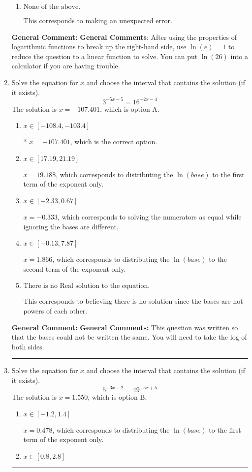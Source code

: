 \documentclass{extbook}[14pt]
\newcommand{\litem}[1]{\item #1

\rule{\textwidth}{0.4pt}}
\begin{document}
\begin{enumerate}
{\begin{enumerate}[label=\Alph*.]
This corresponds to believing you cannot solve the equation.
\item \( \text{None of the above.} \)

This corresponds to making an unexpected error.
\end{enumerate}

\textbf{General Comment:} \textbf{General Comments}: After using the properties of logarithmic functions to break up the right-hand side, use $\ln(e) = 1$ to reduce the question to a linear function to solve. You can put $\ln(26)$ into a calculator if you are having trouble.
}
\litem{
Solve the equation for $x$ and choose the interval that contains the solution (if it exists).
\[ 3^{-5x-5} = 16^{-2x-4} \]The solution is \( x = -107.401 \), which is option A.\begin{enumerate}[label=\Alph*.]
\item \( x \in [-108.4, -103.4] \)

* $x = -107.401$, which is the correct option.
\item \( x \in [17.19, 21.19] \)

$x = 19.188$, which corresponds to distributing the $\ln(base)$ to the first term of the exponent only.
\item \( x \in [-2.33, 0.67] \)

$x = -0.333$, which corresponds to solving the numerators as equal while ignoring the bases are different.
\item \( x \in [-0.13, 7.87] \)

$x = 1.866$, which corresponds to distributing the $\ln(base)$ to the second term of the exponent only.
\item \( \text{There is no Real solution to the equation.} \)

This corresponds to believing there is no solution since the bases are not powers of each other.
\end{enumerate}

\textbf{General Comment:} \textbf{General Comments:} This question was written so that the bases could not be written the same. You will need to take the log of both sides.
}
\litem{
Solve the equation for $x$ and choose the interval that contains the solution (if it exists).
\[ 5^{-3x-2} = 49^{-5x+5} \]The solution is \( x = 1.550 \), which is option B.\begin{enumerate}[label=\Alph*.]
\item \( x \in [-1.2, 1.4] \)

$x = 0.478$, which corresponds to distributing the $\ln(base)$ to the first term of the exponent only.
\item \( x \in [0.8, 2.8] \)


\end{enumerate}}
\end{enumerate}
\end{document}
